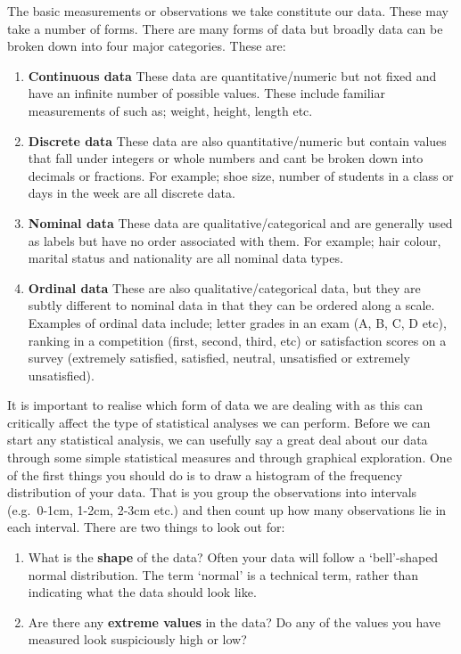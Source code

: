 \documentclass[
]{book}
\begin{document}
The basic measurements or observations we take constitute our data. These may take a number of forms. There are many forms of data but broadly data can be broken down into four major categories.
These are:

\begin{enumerate}
\def\labelenumi{\arabic{enumi})}
\item
  \textbf{Continuous data} These data are quantitative/numeric but not fixed and have an infinite number of possible values. These include familiar measurements of such as; weight, height, length etc.
\item
  \textbf{Discrete data} These data are also quantitative/numeric but contain values that fall under integers or whole numbers and cant be broken down into decimals or fractions. For example; shoe size, number of students in a class or days in the week are all discrete data.
\item
  \textbf{Nominal data} These data are qualitative/categorical and are generally used as labels but have no order associated with them. For example; hair colour, marital status and nationality are all nominal data types.
\item
  \textbf{Ordinal data} These are also qualitative/categorical data, but they are subtly different to nominal data in that they can be ordered along a scale. Examples of ordinal data include; letter grades in an exam (A, B, C, D etc), ranking in a competition (first, second, third, etc) or satisfaction scores on a survey (extremely satisfied, satisfied, neutral, unsatisfied or extremely unsatisfied).
\end{enumerate}

It is important to realise which form of data we are dealing with as this can critically affect the type of statistical analyses we can perform.
Before we can start any statistical analysis, we can usefully say a great deal about our data through some simple statistical measures and through graphical exploration. One of the first things you should do is to draw a histogram of the frequency distribution of your data. That is you group the observations into intervals (e.g.~0-1cm, 1-2cm, 2-3cm etc.) and then count up how many observations lie in each interval.
There are two things to look out for:

\begin{enumerate}
\def\labelenumi{\arabic{enumi})}
\item
  What is the \textbf{shape} of the data? Often your data will follow a `bell'-shaped normal distribution. The term `normal' is a technical term, rather than indicating what the data should look like.
\item
  Are there any \textbf{extreme values} in the data? Do any of the values you have measured look suspiciously high or low?
\end{enumerate}
\end{document}
